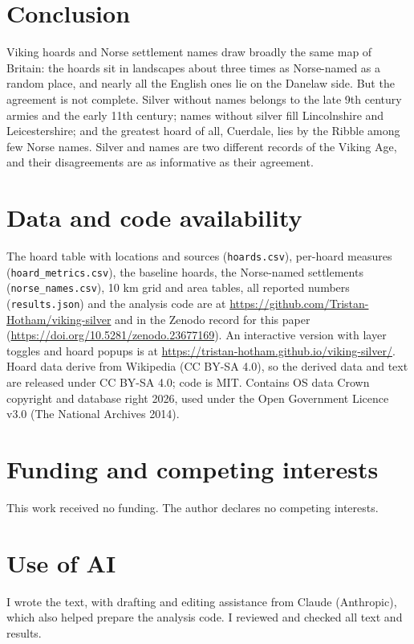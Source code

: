 \documentclass[11pt,a4paper]{article}
\begin{document}
\section{Conclusion}

Viking hoards and Norse settlement names draw broadly the same map of Britain: the hoards sit in landscapes about three times as Norse-named as a random place, and nearly all the English ones lie on the Danelaw side. But the agreement is not complete. Silver without names belongs to the late 9th century armies and the early 11th century; names without silver fill Lincolnshire and Leicestershire; and the greatest hoard of all, Cuerdale, lies by the Ribble among few Norse names. Silver and names are two different records of the Viking Age, and their disagreements are as informative as their agreement.

\section*{Data and code availability}

The hoard table with locations and sources (\texttt{hoards.csv}), per-hoard measures (\texttt{hoard\_metrics.csv}), the baseline hoards, the Norse-named settlements (\texttt{norse\_names.csv}), 10 km grid and area tables, all reported numbers (\texttt{results.json}) and the analysis code are at \url{https://github.com/Tristan-Hotham/viking-silver} and in the Zenodo record for this paper (\url{https://doi.org/10.5281/zenodo.23677169}). An interactive version with layer toggles and hoard popups is at \url{https://tristan-hotham.github.io/viking-silver/}. Hoard data derive from Wikipedia (CC BY-SA 4.0), so the derived data and text are released under CC BY-SA 4.0; code is MIT. Contains OS data \textcopyright{} Crown copyright and database right 2026, used under the Open Government Licence v3.0 (The National Archives 2014).

\section*{Funding and competing interests}

This work received no funding. The author declares no competing interests.

\section*{Use of AI}

I wrote the text, with drafting and editing assistance from Claude (Anthropic), which also helped prepare the analysis code. I reviewed and checked all text and results.
\end{document}
